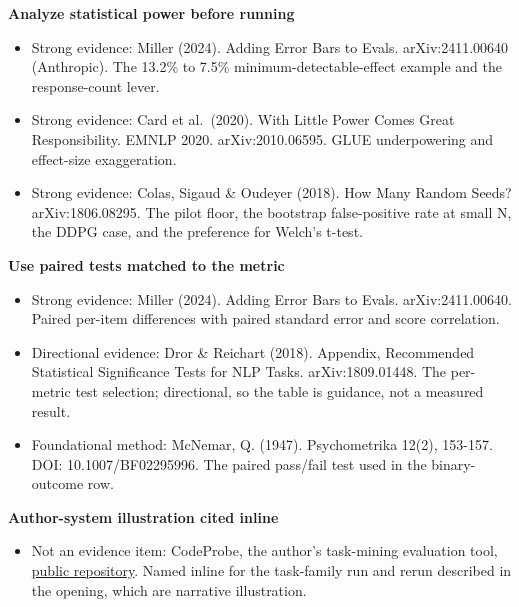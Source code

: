 \textbf{Analyze statistical power before running}

\begin{itemize}
\tightlist
\item
  Strong evidence: Miller (2024). Adding Error Bars to Evals. arXiv:2411.00640 (Anthropic). The 13.2\% to 7.5\% minimum-detectable-effect example and the response-count lever.
\item
  Strong evidence: Card et al.~(2020). With Little Power Comes Great Responsibility. EMNLP 2020. arXiv:2010.06595. GLUE underpowering and effect-size exaggeration.
\item
  Strong evidence: Colas, Sigaud \& Oudeyer (2018). How Many Random Seeds? arXiv:1806.08295. The pilot floor, the bootstrap false-positive rate at small N, the DDPG case, and the preference for Welch's t-test.
\end{itemize}

\textbf{Use paired tests matched to the metric}

\begin{itemize}
\tightlist
\item
  Strong evidence: Miller (2024). Adding Error Bars to Evals. arXiv:2411.00640. Paired per-item differences with paired standard error and score correlation.
\item
  Directional evidence: Dror \& Reichart (2018). Appendix, Recommended Statistical Significance Tests for NLP Tasks. arXiv:1809.01448. The per-metric test selection; directional, so the table is guidance, not a measured result.
\item
  Foundational method: McNemar, Q. (1947). Psychometrika 12(2), 153-157. DOI: 10.1007/BF02295996. The paired pass/fail test used in the binary-outcome row.
\end{itemize}

\textbf{Author-system illustration cited inline}

\begin{itemize}
\tightlist
\item
  Not an evidence item: CodeProbe, the author's task-mining evaluation tool, \href{https://github.com/sjarmak/codeprobe}{public repository}. Named inline for the task-family run and rerun described in the opening, which are narrative illustration.
\end{itemize}
